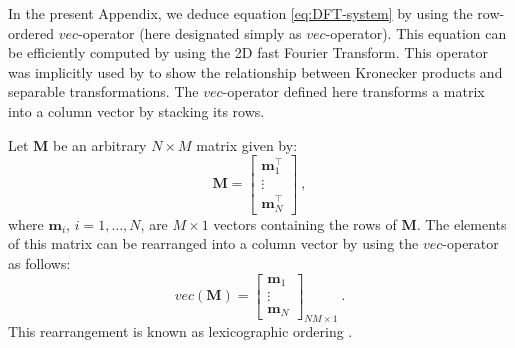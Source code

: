 

In the present Appendix, we deduce equation \ref{eq:DFT-system}
by using the row-ordered $vec$-operator (here designated simply as $vec$-operator).
This equation can be efficiently computed by using the 2D 
fast Fourier Transform. 
This operator was implicitly used by \citet[][ p. 31]{jain1989} to 
show the relationship between Kronecker products and separable 
transformations. The $vec$-operator defined here 
transforms a matrix into a column vector by stacking its rows. 

Let $\mathbf{M}$ be an arbitrary $N \times M$ matrix given by:
\begin{equation}
\mathbf{M} = \begin{bmatrix}
\mathbf{m}^{\top}_{1} \\ 
\vdots \\
\mathbf{m}^{\top}_{N}
\end{bmatrix} \: ,
\label{eq:matrix-M}
\end{equation}
where $\mathbf{m}_{i}$, $i = 1, \dots, N$, are $M \times 1$ vectors containing 
the rows of $\mathbf{M}$.
The elements of this matrix can be rearranged into a column vector by using the
$vec$-operator \citep[][ p. 31]{jain1989} as follows:
\begin{equation}
vec \left( \mathbf{M} \right) = \begin{bmatrix}
\mathbf{m}_{1} \\
\vdots \\
\mathbf{m}_{N}
\end{bmatrix}_{NM \times 1} \: .
\label{eq:vec-operator}
\end{equation}
This rearrangement is known as lexicographic ordering \citep[][ p. 150]{jain1989}.

